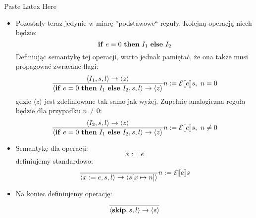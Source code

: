 Paste Latex Here\documentclass{article}
\begin{document}
\begin{itemize}
	\item
	      Pozostały teraz jedynie w miarę ''podstawowe`` reguły. Kolejną operacją niech będzie:
	      $$
	      {\bf if} \ e=0 \ {\bf then} \ I_{1} \ {\bf else} \ I_{2}
	      $$
	      Definiując semantykę tej operacji, warto jednak pamiętać, że ona także musi propagować zwracane flagi:
	      $$
	      \frac {
	      	\langle I_{1}, s, l \rangle \rightarrow \langle z \rangle
	      	} {
	      	\langle {\bf if} \ e=0 \ {\bf then} \ I_{1} \ {\bf else} \ I_{2}, s, l \rangle
	      	\rightarrow \langle z \rangle
	      }
	      n := \mathcal{E} \llbracket e \rrbracket s, \
	      n = 0
	      $$
	      gdzie $\langle z \rangle$ jest zdefiniowane tak samo jak wyżej. Zupełnie analogiczna reguła będzie dla przypadku $n \neq 0$:
	      $$
	      \frac {
	      	\langle I_{2}, s, l \rangle \rightarrow \langle z \rangle
	      	} {
	      	\langle {\bf if} \ e=0 \ {\bf then} \ I_{1} \ {\bf else} \ I_{2}, s, l \rangle
	      	\rightarrow \langle z \rangle
	      }
	      n := \mathcal{E} \llbracket e \rrbracket s, \
	      n \neq 0
	      $$
	\item
	      Semantykę dla operacji:
	      $$
	      x :=  e
	      $$
	      definiujemy standardowo:
	      $$
	      \frac {
	      	\\
	      	} {
	      	\langle x :=  e, s, l \rangle
	      	\rightarrow \langle s[x\mapsto n] \rangle
	      }
	      n := \mathcal{E} \llbracket e \rrbracket s
	      $$

	\item
	      Na koniec definiujemy operację:
	      $$
	      \frac {
	      	\\
	      	} {
	      	\langle {\bf skip}, s, l \rangle
	      	\rightarrow \langle s \rangle
	      }
	      $$




\end{itemize}
\end{document}
